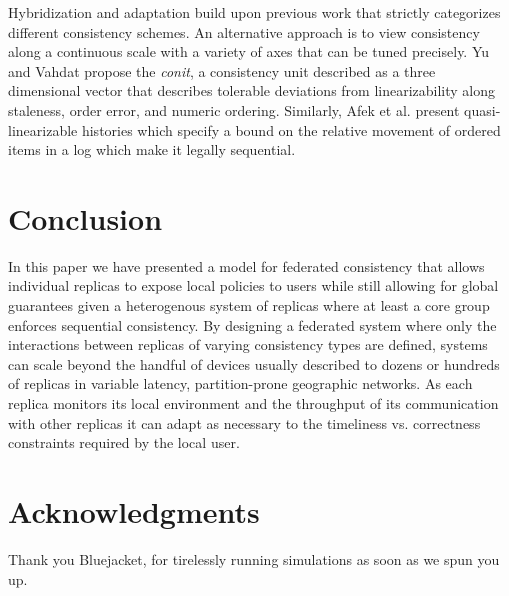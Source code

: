 \documentclass[10pt,conference,letterpaper]{IEEEtran}
\begin{document}
Hybridization and adaptation build upon previous work that strictly categorizes different consistency schemes. An alternative approach is to view consistency along a continuous scale with a variety of axes that can be tuned precisely. Yu and Vahdat \cite{yu_design_2002} propose the \textit{conit}, a consistency unit described as a three dimensional vector that describes tolerable deviations from linearizability along staleness, order error, and numeric ordering. Similarly, Afek et al. \cite{afek_quasi-linearizability:_2010} present quasi-linearizable histories which specify a bound on the relative movement of ordered items in a log which make it legally sequential.

\section{Conclusion}

In this paper we have presented a model for federated consistency that allows individual replicas to expose local policies to users while still allowing for global guarantees given a heterogenous system of replicas where at least a core group enforces sequential consistency. By designing a federated system where only the interactions between replicas of varying consistency types are defined, systems can scale beyond the handful of devices usually described to dozens or hundreds of replicas in variable latency, partition-prone geographic networks. As each replica monitors its local environment and the throughput of its communication with other replicas it can adapt as necessary to the timeliness vs. correctness constraints required by the local user.

\section*{Acknowledgments}

Thank you Bluejacket, for tirelessly running simulations as soon as we spun you up.



\end{document}
